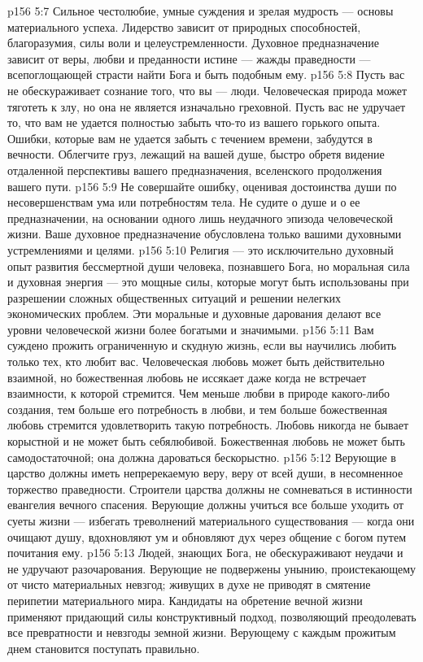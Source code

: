 \vs p156 5:7 Сильное честолюбие, умные суждения и зрелая мудрость --- основы материального успеха. Лидерство зависит от природных способностей, благоразумия, силы воли и целеустремленности. Духовное предназначение зависит от веры, любви и преданности истине --- жажды праведности --- всепоглощающей страсти найти Бога и быть подобным ему.
\vs p156 5:8 Пусть вас не обескураживает сознание того, что вы --- люди. Человеческая природа может тяготеть к злу, но она не является изначально греховной. Пусть вас не удручает то, что вам не удается полностью забыть что\hyp{}то из вашего горького опыта. Ошибки, которые вам не удается забыть с течением времени, забудутся в вечности. Облегчите груз, лежащий на вашей душе, быстро обретя видение отдаленной перспективы вашего предназначения, вселенского продолжения вашего пути.
\vs p156 5:9 Не совершайте ошибку, оценивая достоинства души по несовершенствам ума или потребностям тела. Не судите о душе и о ее предназначении, на основании одного лишь неудачного эпизода человеческой жизни. Ваше духовное предназначение обусловлена только вашими духовными устремлениями и целями.
\vs p156 5:10 Религия --- это исключительно духовный опыт развития бессмертной души человека, познавшего Бога, но моральная сила и духовная энергия --- это мощные силы, которые могут быть использованы при разрешении сложных общественных ситуаций и решении нелегких экономических проблем. Эти моральные и духовные дарования делают все уровни человеческой жизни более богатыми и значимыми.
\vs p156 5:11 Вам суждено прожить ограниченную и скудную жизнь, если вы научились любить только тех, кто любит вас. Человеческая любовь может быть действительно взаимной, но божественная любовь не иссякает даже когда не встречает взаимности, к которой стремится. Чем меньше любви в природе какого\hyp{}либо создания, тем больше его потребность в любви, и тем больше божественная любовь стремится удовлетворить такую потребность. Любовь никогда не бывает корыстной и не может быть себялюбивой. Божественная любовь не может быть самодостаточной; она должна дароваться бескорыстно.
\vs p156 5:12 Верующие в царство должны иметь непререкаемую веру, веру от всей души, в несомненное торжество праведности. Строители царства должны не сомневаться в истинности евангелия вечного спасения. Верующие должны учиться все больше уходить от суеты жизни --- избегать треволнений материального существования --- когда они очищают душу, вдохновляют ум и обновляют дух через общение с богом путем почитания ему.
\vs p156 5:13 Людей, знающих Бога, не обескураживают неудачи и не удручают разочарования. Верующие не подвержены унынию, проистекающему от чисто материальных невзгод; живущих в духе не приводят в смятение перипетии материального мира. Кандидаты на обретение вечной жизни применяют придающий силы конструктивный подход, позволяющий преодолевать все превратности и невзгоды земной жизни. Верующему с каждым прожитым днем становится  поступать правильно.
